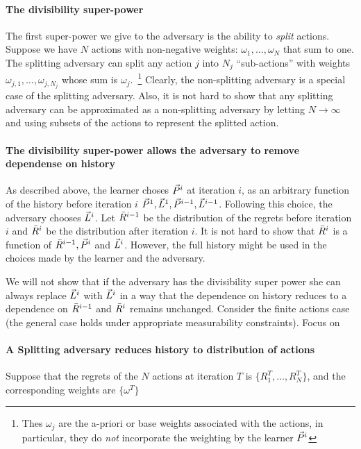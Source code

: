 \documentclass{article}[12pt]
\begin{document}
\paragraph*{The divisibility super-power}
The first super-power we give to the adversary is the ability to {\em
  split} actions. Suppose we have $N$ actions with non-negative
weights: $\omega_1,\ldots,\omega_N$ that sum to one.  The splitting
adversary can split any action $j$ into $N_j$ ``sub-actions'' with
weights $\omega_{j,1},\ldots,\omega_{j,N_j}$ whose sum is
$\omega_j$.~\footnote{Thes $\omega_j$ are the a-priori or base weights
  associated with the actions, in particular, they do {\em not}
  incorporate the weighting by the learner $\vec{P}^{i}$}
Clearly, the non-splitting adversary is a special case of the
splitting adversary. Also, it is not hard to show that any splitting
adversary can be approximated as a non-splitting adversary by letting
$N \to \infty$ and using subsets of the actions to represent the
splitted action.

\paragraph{The divisibility super-power allows the adversary to
  remove dependense on history}
As described above, the learner choses $\vec{P}^{i}$ at iteration $i$, 
as an arbitrary function of the history before iteration $i$
$\vec{P}^{1},\vec{L}^{1},\vec{P}^{i-1},\vec{L}^{i-1}$. Following this choice, the adversary chooses $\vec{L}^{i}$.
Let $\bar{R}^{i-1}$ be the distribution of the regrets before iteration $i$ and $\bar{R}^{i}$
be the distribution after iteration $i$. It is not hard to show that $\bar{R}^{i}$ is a function of
$\bar{R}^{i-1}, \vec{P}^{i}$ and $\vec{L}^{i}$. However, the full history might be used in the choices
made by the learner and the adversary.

We will not show that if the adversary has the divisibility super
power she can always replace $\vec{L}^{i}$ with $\vec{L}^{i}$ in a way that
the dependence on history reduces to a dependence on $\bar{R}^{i-1}$ and
$\bar{R}^{i}$ remains unchanged. Consider the finite actions case (the
general case holds under appropriate measurability constraints). Focus
on


\paragraph*{A Splitting adversary reduces history to distribution of actions}
Suppose that the regrets of the $N$ actions at iteration $T$ is
$\{R_1^T,\ldots,R_N^T\}$, and the corresponding weights are $\{\omega^T\}$
\end{document}
